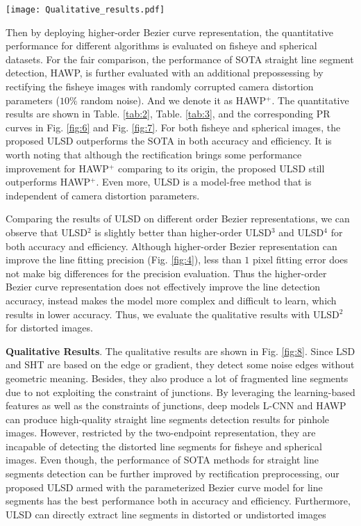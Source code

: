 \documentclass[letterpaper, 10 pt, conference]{ieeeconf}
\begin{document}
\begin{figure*}[h!] 
	\centering
	\begin{center}
		\texttt{[image: Qualitative\_results.pdf]}
	\end{center}
	\caption{Qualitative results and comparisons. Rows: (a)-(b) pinhole case, (c)-(d) fisheye case, (e)-(g) spherical case}
	\label{fig:8}
\end{figure*}


Then by deploying higher-order Bezier curve representation, the quantitative performance for different algorithms is evaluated on fisheye and spherical datasets. For the fair comparison, the performance of SOTA straight line segment detection, HAWP, is further evaluated with an additional prepossessing by rectifying the fisheye images with randomly corrupted camera distortion parameters ($10\%$ random noise). And we denote it as HAWP$^+$. The quantitative results are shown in Table. \ref{tab:2}, Table. \ref{tab:3}, and the corresponding PR curves in Fig. \ref{fig:6} and Fig. \ref{fig:7}. For both fisheye and spherical images, the proposed ULSD outperforms the SOTA in both accuracy and efficiency. It is worth noting that although the rectification brings some performance improvement for HAWP$^+$ comparing to its origin, the proposed ULSD still outperforms HAWP$^+$. Even more, ULSD is a model-free method that is independent of camera distortion parameters.

Comparing the results of ULSD on different order Bezier representations, we can observe that ULSD$^2$ is slightly better than higher-order ULSD$^3$ and ULSD$^4$ for both accuracy and efficiency. Although higher-order Bezier representation can improve the line fitting precision (Fig. \ref{fig:4}), less than $1$ pixel fitting error does not make big differences for the precision evaluation. Thus the higher-order Bezier curve representation does not effectively improve the line detection accuracy, instead makes the model more complex and difficult to learn, which results in lower accuracy. Thus, we evaluate the qualitative results with ULSD$^2$ for distorted images.

\noindent \textbf{Qualitative Results}. The qualitative results are shown in Fig. \ref{fig:8}. Since LSD and SHT are based on the edge or gradient, they detect some noise edges without geometric meaning. Besides, they also produce a lot of fragmented line segments due to not exploiting the constraint of junctions. By leveraging the learning-based features as well as the constraints of junctions, deep models L-CNN and HAWP can produce high-quality straight line segments detection results for pinhole images. However, restricted by the two-endpoint representation, they are incapable of detecting the distorted line segments for fisheye and spherical images. Even though, the performance of SOTA methods for straight line segments detection can be further improved by rectification preprocessing, our proposed ULSD armed with the parameterized Bezier curve model for line segments has the best performance both in accuracy and efficiency. Furthermore, ULSD can directly extract line segments in distorted or undistorted images
\end{document}

